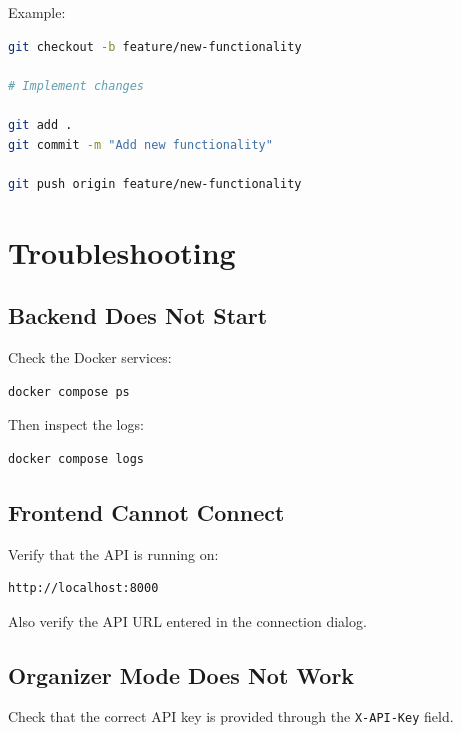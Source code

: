 \documentclass[12pt,a4paper]{article}
\begin{document}
Example:

\begin{lstlisting}[language=bash]
git checkout -b feature/new-functionality

# Implement changes

git add .
git commit -m "Add new functionality"

git push origin feature/new-functionality
\end{lstlisting}


\section{Troubleshooting}

\subsection{Backend Does Not Start}

Check the Docker services:

\begin{lstlisting}[language=bash]
docker compose ps
\end{lstlisting}

Then inspect the logs:

\begin{lstlisting}[language=bash]
docker compose logs
\end{lstlisting}

\subsection{Frontend Cannot Connect}

Verify that the API is running on:

\begin{lstlisting}
http://localhost:8000
\end{lstlisting}

Also verify the API URL entered in the connection dialog.

\subsection{Organizer Mode Does Not Work}

Check that the correct API key is provided through the
\texttt{X-API-Key} field.
\end{document}
